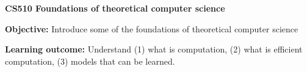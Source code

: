 \documentclass[12pt, a4paper]{letter} %
\begin{document}
\begin{comment}
   \begin{minipage}{0.5\textwidth}
\address{Dr. Arpita Korwar\\Dept. of Computer Science (SMCS)}
    \end{minipage}
    \hfill
    \begin{minipage}{0.5\textwidth}\raggedright
\address{Dr. Saurabh Trivedi\\Dept. of Mathematics (SMCS)}
    \end{minipage}

    \vspace{0.4in} %
 
\end{comment}
\newcommand*{\dittoclosing}{---''---}


\begin{comment}
    \begin{minipage}{0.5\textwidth}
        \texttt{[image: pic/NENU\_Logo.png]}\\ %
    \end{minipage}
    \hfill
    \begin{minipage}{0.6\textwidth}\raggedright
        \small{ 
            \hphantom{AA}Room xxx, Academic Building \\ %
            \hphantom{AA}School of Information Science and Technology \\
            \hphantom{AA}NorthEast Normal University \\
            \hphantom{AA}No.2555 Jingyue Street, Nanguan District \\
            \hphantom{AA}Changchun, P. R. China, 130117 \\
        }
    \end{minipage}

    \vspace{0.4in} %
\end{comment}


\begin{center}
    \textbf{CS510 Foundations of theoretical computer science %
    }    
\end{center}
\textbf{Objective:} Introduce some of the foundations of theoretical computer science

\textbf{Learning outcome:} Understand (1) what is computation, (2) what is efficient computation, (3) models that can be learned.
\end{document}

